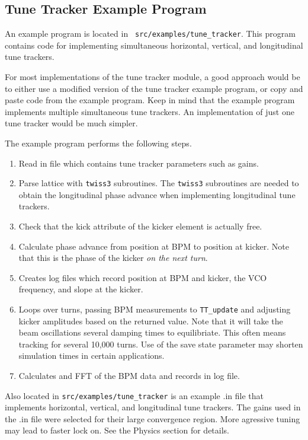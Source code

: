 \subsection{Tune Tracker Example Program}

An example program is located in {\tt
src/examples/tune\_tracker}. This program contains code for
implementing simultaneous horizontal, vertical, and longitudinal tune
trackers.

For most implementations of the tune tracker module, a good approach
would be to either use a modified version of the tune tracker example
program, or copy and paste code from the example program.  Keep in
mind that the example program implements multiple simultaneous tune
trackers.  An implementation of just one tune tracker would be much
simpler.

The example program performs the following steps.
\begin{enumerate}
\item 
Read in file which contains tune tracker parameters such as gains.
\item 
Parse lattice with {\tt twiss3} subroutines.  The {\tt twiss3} subroutines
are needed to obtain the longitudinal phase advance when implementing 
longitudinal tune trackers.
\item 
Check that the kick attribute of the kicker element is actually free.
\item 
Calculate phase advance from position at BPM to position at kicker.  Note that this 
is the phase of the kicker {\it on the next turn}.
\item 
Creates log files which record position at BPM and kicker, the VCO frequency,
and slope at the kicker.
\item
Loops over turns, passing BPM measurements to {\tt TT\_update} and
adjusting kicker amplitudes based on the returned value.  Note that it
will take the beam oscillations several damping times to equilibriate.
This often means tracking for several 10,000 turns.  Use of the save
state parameter may shorten simulation times in certain applications.
\item 
Calculates and FFT of the BPM data and records in log file. 
\end{enumerate}

Also located in {\tt src/examples/tune\_tracker} is an example .in
file that implements horizontal, vertical, and longitudinal tune
trackers.  The gains used in the .in file were selected for their
large convergence region.  More agressive tuning may lead to faster
lock on.  See the Physics section for details.

